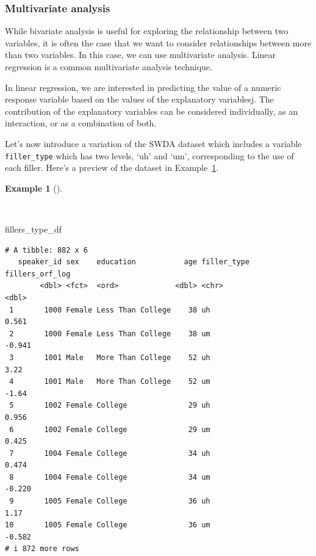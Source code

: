 \documentclass[
  letterpaper,
  krantz1]{latex/krantz-mod}
\newenvironment{Shaded}{\begin{snugshade}}{\end{snugshade}}
\newcommand{\NormalTok}[1]{\textcolor[rgb]{0.00,0.00,0.00}{#1}}
\theoremstyle{definition}
\theoremstyle{definition}
\newtheorem{example}{Example}[chapter]
\theoremstyle{remark}
\begin{document}
\subsubsection{Multivariate analysis}\label{multivariate-analysis-1}

While bivariate analysis is useful for exploring the relationship
between two variables, it is often the case that we want to consider
relationships between more than two variables. In this case, we can use
multivariate analysis. Linear regression is a common multivariate
analysis technique.

In linear regression, we are interested in predicting the value of a
numeric response variable based on the values
of the explanatory variablesj. The
contribution of the explanatory variables can be considered
individually, as an
interaction, or as a combination of both.

Let's now introduce a variation of the
SWDA dataset which includes
a variable \texttt{filler\_type} which has two levels, `uh' and `um',
corresponding to the use of each filler. Here's a preview of the dataset
in Example~\ref{exm-infer-num-fillers-type-dataset}.

\begin{example}[]\protect\hypertarget{exm-infer-num-fillers-type-dataset}{}\label{exm-infer-num-fillers-type-dataset}

~

\begin{Shaded}
\begin{Highlighting}[numbers=left,,]
\NormalTok{fillers\_type\_df}
\end{Highlighting}
\end{Shaded}

\begin{verbatim}
# A tibble: 882 x 6
   speaker_id sex    education           age filler_type fillers_orf_log
        <dbl> <fct>  <ord>             <dbl> <chr>                 <dbl>
 1       1000 Female Less Than College    38 uh                    0.561
 2       1000 Female Less Than College    38 um                   -0.941
 3       1001 Male   More Than College    52 uh                    3.22 
 4       1001 Male   More Than College    52 um                   -1.64 
 5       1002 Female College              29 uh                    0.956
 6       1002 Female College              29 um                    0.425
 7       1004 Female College              34 uh                    0.474
 8       1004 Female College              34 um                   -0.220
 9       1005 Female College              36 uh                    1.17 
10       1005 Female College              36 um                   -0.582
# i 872 more rows
\end{verbatim}

\end{example}
\end{document}
